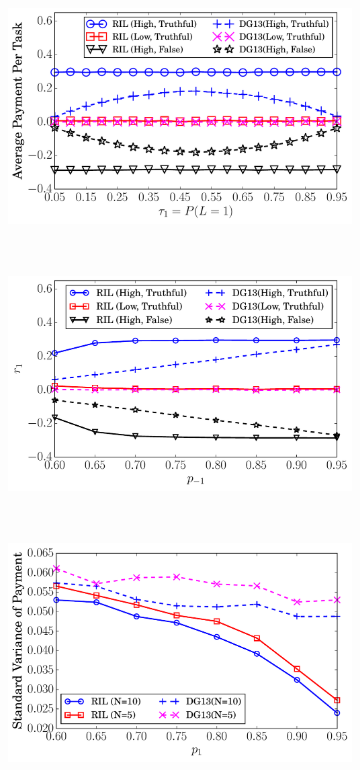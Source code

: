 \begin{figure}[!htb]
    \centering
    \begin{subfigure}[t]{0.32\textwidth}
        \centering
        \includegraphics[width=\textwidth]{image/BPP1}
        \caption{\label{BIM2}}
    \end{subfigure}%
    ~
    \begin{subfigure}[t]{0.32\textwidth}
        \centering
        \includegraphics[width=\textwidth]{image/BPP2}
        \caption{\label{BIM3}}
    \end{subfigure}
        ~
    \begin{subfigure}[t]{0.32\textwidth}
        \centering
        \includegraphics[width=\textwidth]{image/BPP3}

\end{subfigure}
\end{figure}
